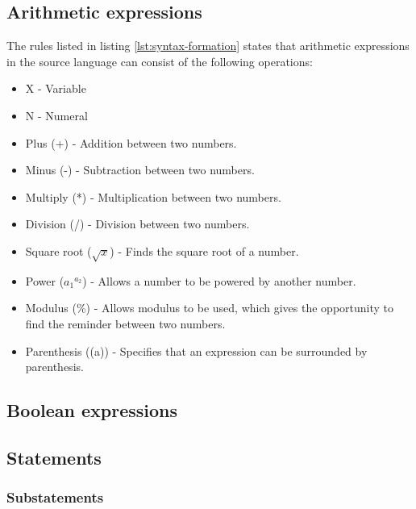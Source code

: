 \subsection{Arithmetic expressions}
The rules listed in listing \ref{lst:syntax-formation} states that arithmetic expressions in the source language can consist of the following operations:
\begin{itemize}
	\item X - Variable
	\item N - Numeral
	\item Plus (+) - Addition between two numbers.
	\item Minus (-) - Subtraction between two numbers.
	\item Multiply (*) - Multiplication between two numbers.
	\item Division (/) - Division between two numbers.
	\item Square root ($\sqrt{x}$) - Finds the square root of a number.
	\item Power (${a_1}^{a_2}$) - Allows a number to be powered by another number.
	\item Modulus (\%) - Allows modulus to be used, which gives the opportunity to find the reminder between two numbers.
	\item Parenthesis ((a)) - Specifies that an expression can be surrounded by parenthesis.
\end{itemize}

\subsection{Boolean expressions}

\subsection{Statements}

\subsubsection{Substatements}


